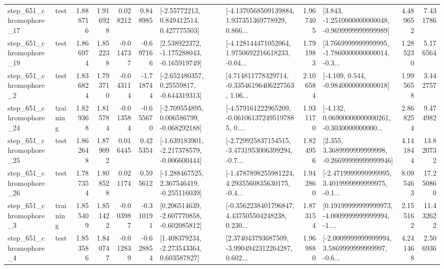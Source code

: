 \begin{tabular}{llrrrrllrlrr}
  step\_651\_chromophore\_17 &      test &      1.888716 &    1.916928 &      0.028212 &  0.848985 &     [-2.55772213, 0.849412514, 0.427775503] &  [-4.1370568509139884, 1.937351369778929, 0.866... &       1.967405 &  [3.843, -1.2510000000000048, -0.9699999999999989] &            4.489652 &          7.431786 \\
  step\_651\_chromophore\_19 &      test &      1.866974 &    1.852238 &     -0.014737 & -0.697166 &   [2.538922372, -1.175288043, -0.165919749] &  [-4.128144471052064, 1.9750692216618233, -0.04... &       1.791983 &  [3.7669999999999995, -1.7860000000000014, -0.3... &            1.285230 &          5.176564 \\
   step\_651\_chromophore\_2 &      test &      1.836824 &    1.793710 &     -0.043114 & -1.718744 &    [-2.652480357, 0.25559817, -0.644319313] &  [4.714811778329714, -0.33546196406227563, 1.06... &       2.106584 &               [-4.109, 0.544, -0.9840000000000018] &            1.995658 &          3.442757 \\
  step\_651\_chromophore\_24 &  training &      1.829368 &    1.815784 &     -0.013584 & -0.655670 &   [-2.709554895, 0.006586799, -0.068292188] &  [-4.579161222965209, -0.061061372495197885, 0.... &       1.931170 &  [-4.132, 0.06900000000000261, -0.3030000000000... &            2.868254 &          9.474982 \\
  step\_651\_chromophore\_25 &      test &      1.862648 &    1.879092 &      0.016445 &  0.425354 &  [-1.639183901, -2.217378579, -0.006600444] &  [-2.729925837154515, -3.4731953006399294, -0.7... &       1.824956 &  [2.355, 3.3689999999999998, -0.26699999999999946] &            4.141844 &         13.820732 \\
  step\_651\_chromophore\_26 &      test &      1.787354 &    1.808528 &      0.021174 &  0.595612 &   [-1.288467525, 2.367546419, -0.255116039] &  [-1.4787898255981224, 4.2935560835630175, -0.4... &       1.942860 &  [-2.4719999999999995, 3.4019999999999975, -0.1... &            8.095463 &         17.250860 \\
   step\_651\_chromophore\_3 &  training &      1.855409 &    1.851422 &     -0.003987 & -0.310191 &   [0.206514639, -2.607770858, -0.602085812] &  [-0.3562238401796847, 4.437505504248238, 0.230... &       1.873154 &  [0.19199999999999973, -4.0009999999999994, -1.... &            2.155162 &         11.432622 \\
   step\_651\_chromophore\_4 &      test &      1.853586 &    1.840747 &     -0.012839 & -0.628854 &    [1.408379234, -2.273543364, 0.603587827] &  [2.374043793687509, -3.9904942312264287, 0.602... &       1.969880 &  [-2.0009999999999994, 3.5869999999999997, -0.6... &            4.241468 &          2.506936 \\

\end{tabular}
